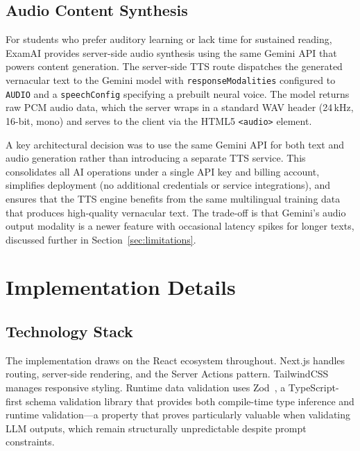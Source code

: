 \documentclass[conference]{IEEEtran}
\begin{document}
\subsection{Audio Content Synthesis}

For students who prefer auditory learning or lack time for sustained reading, ExamAI provides server-side audio synthesis using the same Gemini API that powers content generation. The server-side TTS route dispatches the generated vernacular text to the Gemini model with \texttt{responseModalities} configured to \texttt{AUDIO} and a \texttt{speechConfig} specifying a prebuilt neural voice. The model returns raw PCM audio data, which the server wraps in a standard WAV header (24\,kHz, 16-bit, mono) and serves to the client via the HTML5 \texttt{<audio>} element.

A key architectural decision was to use the same Gemini API for both text and audio generation rather than introducing a separate TTS service. This consolidates all AI operations under a single API key and billing account, simplifies deployment (no additional credentials or service integrations), and ensures that the TTS engine benefits from the same multilingual training data that produces high-quality vernacular text. The trade-off is that Gemini's audio output modality is a newer feature with occasional latency spikes for longer texts, discussed further in Section~\ref{sec:limitations}.

\section{Implementation Details}
\label{sec:implementation}

\subsection{Technology Stack}

The implementation draws on the React ecosystem throughout. Next.js handles routing, server-side rendering, and the Server Actions pattern. TailwindCSS manages responsive styling. Runtime data validation uses Zod~\cite{zod}, a TypeScript-first schema validation library that provides both compile-time type inference and runtime validation---a property that proves particularly valuable when validating LLM outputs, which remain structurally unpredictable despite prompt constraints.
\end{document}
